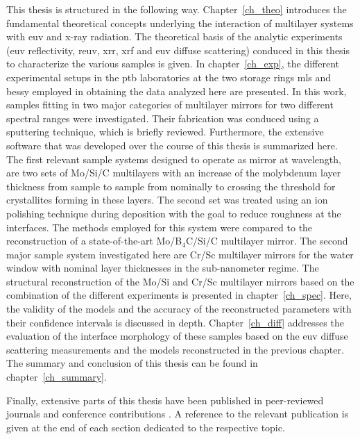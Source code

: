 This thesis is structured in the following way. Chapter~\ref{ch_theo} introduces the fundamental theoretical concepts underlying the interaction of multilayer systems with \gls{euv} and x-ray radiation. The theoretical basis of the analytic experiments (\gls{euv} reflectivity, \gls{reuv}, \gls{xrr}, \gls{xrf} and \gls{euv} diffuse scattering) conduced in this thesis to characterize the various samples is given. In chapter~\ref{ch_exp}, the different experimental setups in the \gls{ptb} laboratories at the two storage rings \gls{mls} and \gls{bessy} employed in obtaining the data analyzed here are presented. In this work, samples fitting in two major categories of multilayer mirrors for two different spectral ranges were investigated. Their fabrication was conduced using a sputtering technique, which is briefly reviewed. Furthermore, the extensive software that was developed over the course of this thesis is summarized here. The first relevant sample systems designed to operate as mirror at  wavelength, are two sets of Mo/Si/C multilayers with an increase of the  molybdenum layer thickness from sample to sample from nominally  to  crossing the threshold for crystallites forming in these layers. The second set was treated using an ion polishing technique during deposition with the goal to reduce roughness at the interfaces. The methods employed for this system were compared to the reconstruction of a state-of-the-art Mo/B$_4$C/Si/C multilayer mirror. The second major sample system investigated here are Cr/Sc multilayer mirrors for the water window with nominal layer thicknesses in the sub-nanometer regime. The structural reconstruction of the Mo/Si and Cr/Sc multilayer mirrors based on the combination of the different experiments is presented in chapter~\ref{ch_spec}. Here, the validity of the models and the accuracy of the reconstructed parameters with their confidence intervals is discussed in depth. Chapter~\ref{ch_diff} addresses the evaluation of the interface morphology of these samples based on the \gls{euv} diffuse scattering measurements and the models reconstructed in the previous chapter. The summary and conclusion of this thesis can be found in chapter~\ref{ch_summary}.

Finally, extensive parts of this thesis have been published in peer-reviewed journals and conference contributions \cite{haase_role_2014, haase_characterization_2015, haase_multiparameter_2016, haase_interface_2017}. A reference to the relevant publication is given at the end of each section dedicated to the respective topic.

